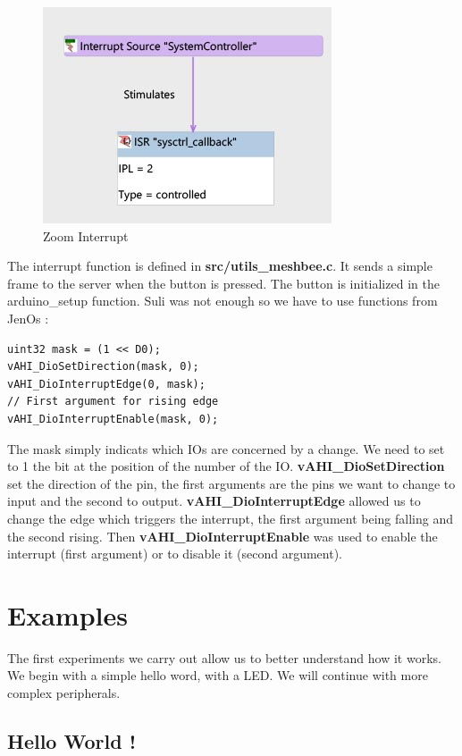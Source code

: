\begin{figure}[ht]
\centering
\includegraphics[width=.6\linewidth]{zoom_interrupt}
\caption[Zoom Interrupt]{\label{f:zoom_interrupt}Zoom Interrupt}
\end{figure}

The interrupt function is defined in \textbf{src/utils\_meshbee.c}. It sends a simple frame to the server when the button is pressed. The button is initialized in the arduino\_setup function. Suli was not enough so we have to use functions from JenOs :


\begin{lstlisting}[frame=single]
uint32 mask = (1 << D0);
vAHI_DioSetDirection(mask, 0);
vAHI_DioInterruptEdge(0, mask);
// First argument for rising edge
vAHI_DioInterruptEnable(mask, 0);
\end{lstlisting}

The mask simply indicats which IOs are concerned by a change. We need to set to 1 the bit at the position of the number of the IO. \textbf{vAHI\_DioSetDirection} set the direction of the pin, the first arguments are the pins we want to change to input and the second to output. \textbf{vAHI\_DioInterruptEdge} allowed us to change the edge which triggers the interrupt, the first argument being falling and the second rising. Then \textbf{vAHI\_DioInterruptEnable} was used to enable the interrupt (first argument) or to disable it (second argument).

\section{Examples}

The first experiments we carry out allow us to better understand how it works. We begin with a simple hello word, with a LED. We will continue with more complex peripherals.

\subsection{Hello World !}

